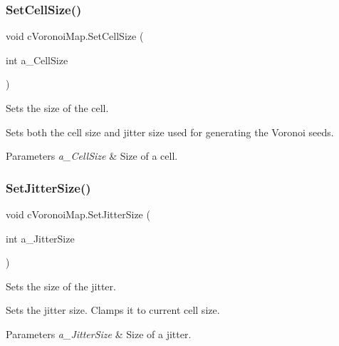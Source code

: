 \subsubsection{\texorpdfstring{Set\+Cell\+Size()}{SetCellSize()}}
{\footnotesize\ttfamily void c\+Voronoi\+Map.\+Set\+Cell\+Size (\begin{DoxyParamCaption}\item[{int}]{a\+\_\+\+Cell\+Size }\end{DoxyParamCaption})\hspace{0.3cm}{\ttfamily [inline]}}



Sets the size of the cell. 

Sets both the cell size and jitter size used for generating the Voronoi seeds. 
\begin{DoxyParams}{Parameters}
{\em a\+\_\+\+Cell\+Size} & Size of a cell.\\
\hline
\end{DoxyParams}
\mbox{\label{classc_voronoi_map_ab9f95a3c7799d9010885145f19ce77b1}} 
\subsubsection{\texorpdfstring{Set\+Jitter\+Size()}{SetJitterSize()}}
{\footnotesize\ttfamily void c\+Voronoi\+Map.\+Set\+Jitter\+Size (\begin{DoxyParamCaption}\item[{int}]{a\+\_\+\+Jitter\+Size }\end{DoxyParamCaption})\hspace{0.3cm}{\ttfamily [inline]}}



Sets the size of the jitter. 

Sets the jitter size. Clamps it to current cell size. 
\begin{DoxyParams}{Parameters}
{\em a\+\_\+\+Jitter\+Size} & Size of a jitter.\\
\hline
\end{DoxyParams}
\mbox{\label{classc_voronoi_map_a7c2196f0a071bb4f1ed9dbc82f42faed}} 
